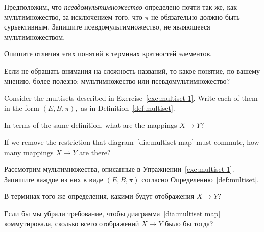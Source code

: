 \documentclass[CT4S-EN-RU]{subfiles}
\begin{document}
\begin{exerciseRUS}
Предположим, что {\em псевдомультимножество} определено почти так же, как мультимножество, за исключением того, что $\pi$ не обязательно должно быть сурьективным. 
\sexc Запишите псевдомультимножество, не являющееся мультимножеством. 
\item Опишите отличия этих понятий в терминах кратностей элементов. 
\item Если не обращать внимания на сложность названий, то какое понятие, по вашему мнению, более полезно: мультимножество или псевдомультимножество? 
\endsexc
\end{exerciseRUS}

\begin{exerciseENG}
Consider the multisets described in Exercise~\ref{exc:multiset 1}. 
\sexc Write each of them in the form $(E,B,\pi),$ as in Definition~\ref{def:multiset}. 
\item In terms of the same definition, what are the mappings $X\to Y?$ 
\item If we remove the restriction that diagram~\ref{dia:multiset map} must commute, how many mappings $X\to Y$ are there?
\endsexc
\end{exerciseENG}

\begin{exerciseRUS}
Рассмотрим мультимножества, описанные в Упражнении~\ref{exc:multiset 1}. 
\sexc Запишите каждое из них в виде $(E,B,\pi)$ согласно Определению~\ref{def:multiset}. 
\item В терминах того же определения, какими будут отображения $X\to Y?$ 
\item Если бы мы убрали требование, чтобы диаграмма~\ref{dia:multiset map} коммутировала, сколько всего отображений $X\to Y$ было бы тогда?
\endsexc
\end{exerciseRUS}
\end{document}
